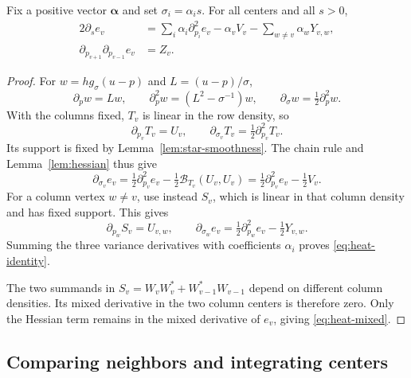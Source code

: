 \begin{lemma}\label{lem:heat-identities}
Fix a positive vector $\boldsymbol\alpha$ and set $\sigma_i=\alpha_i s$.
For all centers and all $s>0$,
\begin{align}
 2\partial_s e_v
 &=\sum_i\alpha_i\partial_{p_i}^2e_v
       -\alpha_vV_v-\sum_{w\ne v}\alpha_wY_{v,w},
       \label{eq:heat-identity}\\
 \partial_{p_{v+1}}\partial_{p_{v-1}}e_v&=Z_v.
       \label{eq:heat-mixed}
\end{align}
\end{lemma}
\begin{proof}
For $w=h g_\sigma(u-p)$ and $L=(u-p)/\sigma$,
\[
 \partial_pw=Lw,\qquad
 \partial_p^2w=(L^2-\sigma^{-1})w,\qquad
 \partial_\sigma w=\tfrac12\partial_p^2w.
\]
With the columns fixed, $T_v$ is linear in the row density, so
\[
 \partial_{p_v}T_v=U_v,\qquad
 \partial_{\sigma_v}T_v=\tfrac12\partial_{p_v}^2T_v.
\]
Its support is fixed by Lemma~\ref{lem:star-smoothness}.  The chain rule
and Lemma~\ref{lem:hessian} thus give
\[
 \partial_{\sigma_v}e_v
 =\tfrac12\partial_{p_v}^2e_v
    -\tfrac12\mathcal B_{T_v}(U_v,U_v)
 =\tfrac12\partial_{p_v}^2e_v-\tfrac12V_v.
\]
For a column vertex $w\ne v$, use instead $S_v$, which is linear in that
column density and has fixed support.  This gives
\[
 \partial_{p_w}S_v=U_{v,w},\qquad
 \partial_{\sigma_w}e_v=\tfrac12\partial_{p_w}^2e_v-\tfrac12Y_{v,w}.
\]
Summing the three variance derivatives with coefficients $\alpha_i$
proves \eqref{eq:heat-identity}.

The two summands in $S_v=W_vW_v^*+W_{v-1}^*W_{v-1}$ depend on different
column densities.  Its mixed derivative in the two column centers is
therefore zero.  Only the Hessian term remains in the mixed derivative of
$e_v$, giving \eqref{eq:heat-mixed}.
\end{proof}

\subsection{Comparing neighbors and integrating centers}

